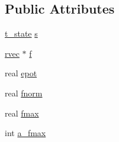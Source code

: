 \subsection*{\-Public \-Attributes}
\begin{DoxyCompactItemize}
\item 
\hyperlink{structt__state}{t\-\_\-state} \hyperlink{structem__state__t_ad406602b47888b41f9cab778c321ca64}{s}
\item 
\hyperlink{share_2template_2gromacs_2types_2simple_8h_aa02a552a4abd2f180c282a083dc3a999}{rvec} $\ast$ \hyperlink{structem__state__t_a02369fada3124cffae5fb7871ffc6c44}{f}
\item 
real \hyperlink{structem__state__t_a5dfa221d8f0a53795db611ac7c4f50dd}{epot}
\item 
real \hyperlink{structem__state__t_ae7959f870c53f37caff1d11e239bffe8}{fnorm}
\item 
real \hyperlink{structem__state__t_a3513532293a8a09954d07eee52de57c8}{fmax}
\item 
int \hyperlink{structem__state__t_a31d7ba83d5b3f033d94769fb8da7bd5b}{a\-\_\-fmax}
\end{DoxyCompactItemize}


